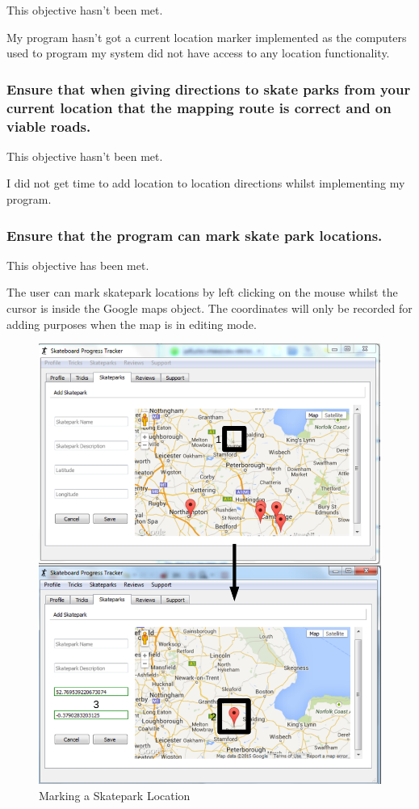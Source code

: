 This objective hasn't been met.

My program hasn't got a current location marker implemented as the computers used to program my system did not have access to any location functionality.

\subsubsection {Ensure that when giving directions to skate parks from your current location that the mapping route is correct and on viable roads. }

This objective hasn't been met.

I did not get time to add location to location directions whilst implementing my program.

\subsubsection {Ensure that the program can mark skate park locations.}

This objective has been met.

The user can mark skatepark locations by left clicking on the mouse whilst the cursor is inside the Google maps object. The coordinates will only be recorded for adding purposes when the map is in editing mode.

\begin{figure}[H]
    \includegraphics[width=\textwidth]{./Evaluation/images/MarkerEvidence.pdf}
    \caption{Marking a Skatepark Location} \label{fig:MarkerEvidence}
\end{figure}

